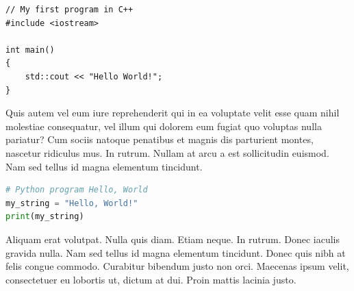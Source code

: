 
\begin{lstlisting}[label=src:CppListing,caption={Program Hello world in C++ language}]
// My first program in C++
#include <iostream>

int main()
{
	std::cout << "Hello World!";
}
\end{lstlisting}

Quis autem vel eum iure reprehenderit qui in ea voluptate velit esse quam nihil molestiae consequatur, vel illum qui dolorem eum fugiat quo voluptas nulla pariatur? Cum sociis natoque penatibus et magnis dis parturient montes, nascetur ridiculus mus. In rutrum. Nullam at arcu a est sollicitudin euismod. Nam sed tellus id magna elementum tincidunt.

\begin{lstlisting}[language=Python,label=src:PythonListing,caption={Program Hello world in Python language}]
# Python program Hello, World
my_string = "Hello, World!"
print(my_string)
\end{lstlisting}

Aliquam erat volutpat. Nulla quis diam. Etiam neque. In rutrum. Donec iaculis gravida nulla. Nam sed tellus id magna elementum tincidunt. Donec quis nibh at felis congue commodo. Curabitur bibendum justo non orci. Maecenas ipsum velit, consectetuer eu lobortis ut, dictum at dui. Proin mattis lacinia justo.
\endinput